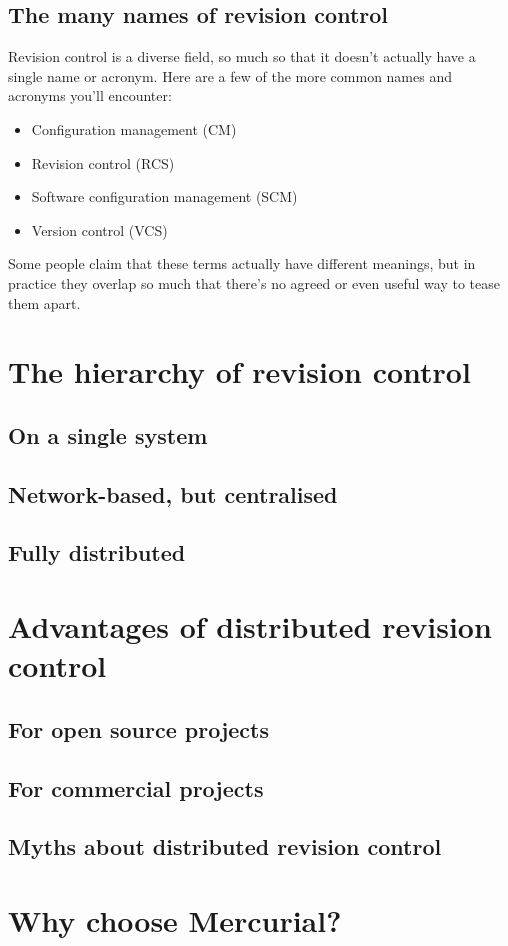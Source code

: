 \subsection{The many names of revision control}

Revision control is a diverse field, so much so that it doesn't
actually have a single name or acronym.  Here are a few of the more
common names and acronyms you'll encounter:
\begin{itemize}
\item Configuration management (CM)
\item Revision control (RCS)
\item Software configuration management (SCM)
\item Version control (VCS)
\end{itemize}
Some people claim that these terms actually have different meanings,
but in practice they overlap so much that there's no agreed or even
useful way to tease them apart.

\section{The hierarchy of revision control}


\subsection{On a single system}

\subsection{Network-based, but centralised}

\subsection{Fully distributed}


\section{Advantages of distributed revision control}

\subsection{For open source projects}

\subsection{For commercial projects}

\subsection{Myths about distributed revision control}

\section{Why choose Mercurial?}


